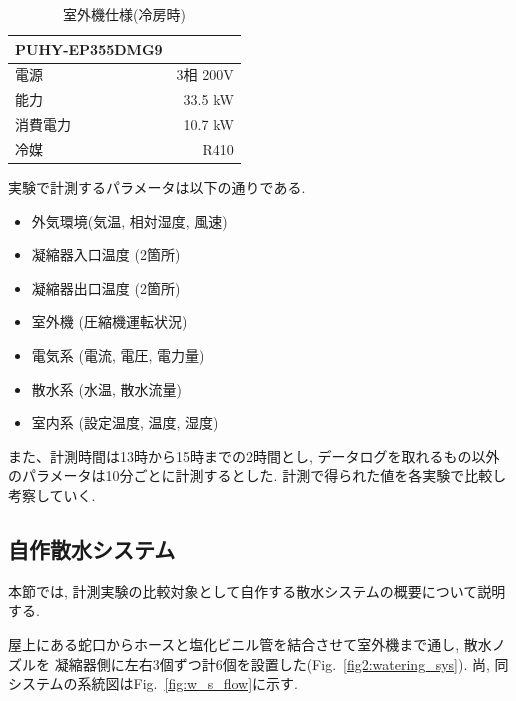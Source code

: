 \documentclass[a4j,fleqn,dvipdfmx,uplatex]{jsarticle}
\newcommand{\figref}[1]{Fig.\ \ref{#1}}
\begin{document}
\begin{table}[htb]
  \caption{室外機仕様(冷房時)}
  \label{table:hard}
  \centering
  \begin{tabular}{lr}
    PUHY-EP355DMG9 & \\
    \hline \hline
    電源 & 3相 200V \\
    能力 & 33.5 kW \\
    消費電力 & 10.7 kW \\
    冷媒 & R410 \\
    \hline
  \end{tabular}
\end{table}

実験で計測するパラメータは以下の通りである. 

\begin{itemize}
  \item 外気環境(気温, 相対湿度, 風速)
  \item 凝縮器入口温度 (2箇所)
  \item 凝縮器出口温度 (2箇所)
  \item 室外機 (圧縮機運転状況)
  \item 電気系 (電流, 電圧, 電力量)
  \item 散水系 (水温, 散水流量)
  \item 室内系 (設定温度, 温度, 湿度)
\end{itemize}

また、計測時間は13時から15時までの2時間とし, 
データログを取れるもの以外のパラメータは10分ごとに計測するとした. 
計測で得られた値を各実験で比較し考察していく. 

\subsection{自作散水システム}
本節では, 計測実験の比較対象として自作する散水システムの概要について説明する.

屋上にある蛇口からホースと塩化ビニル管を結合させて室外機まで通し, 散水ノズルを
凝縮器側に左右3個ずつ計6個を設置した(\figref{fig2:watering_sys}). 
尚, 同システムの系統図は\figref{fig:w_s_flow}に示す. 
\end{document}
